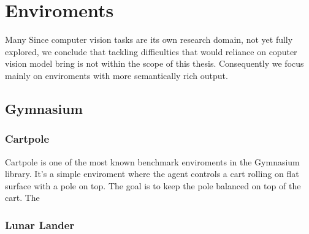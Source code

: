 \chapter{Enviroments}
Many 
Since computer vision tasks are its own research domain, not yet fully explored, we conclude that tackling 
difficulties that would reliance on coputer vision model bring is not within the scope of this thesis. 
Consequently we focus mainly on enviroments with more semantically rich output.
\section{Gymnasium}

\subsection{Cartpole}
Cartpole is one of the most known benchmark enviroments in the Gymnasium library. It's a simple enviroment where the agent controls a cart rolling on flat surface with a pole on top.
The goal is to keep the pole balanced on top of the cart. The
\subsection{Lunar Lander}